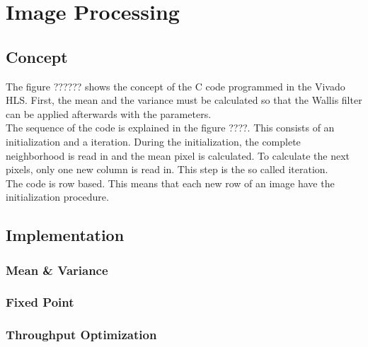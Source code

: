 %
%
\chapter{Image Processing}  \label{chapt:image_processing}

\section{Concept}
The figure ?????? shows the concept of the C code programmed in the Vivado HLS. First, the mean and the variance must be calculated so that the Wallis filter can be applied afterwards with the parameters. \\
The sequence of the code is explained in the figure ????. This consists of an initialization and a iteration. During the initialization, the complete neighborhood is read in and the mean pixel is calculated. To calculate the next pixels, only one new column is read in. This step is the so called iteration.\\
The code is row based. This means that each new row of an image have the initialization procedure.


\section{Implementation}

\subsection{Mean \& Variance}

\subsection{Fixed Point}

\subsection{Throughput Optimization}
